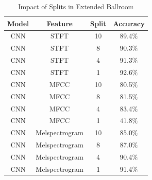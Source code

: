 \documentclass[10pt,twocolumn,letterpaper]{article}
\begin{document}
	\begin{table}[!htbp] %
		\caption{Impact of Splits in Extended Ballroom}
		\centering
		\begin{tabular}[b]{cccc}
			\hline \hline
			Model & Feature & Split & Accuracy 		\\ [0.5ex]
			\hline
			CNN & STFT &  10 & 89.4\%				\\
			CNN & STFT &  8 & 90.3\%				\\
			CNN & STFT &  4 & 91.3\%				\\
			CNN & STFT &  1 & 92.6\%				\\
			CNN & MFCC &  10 & 80.5\%				\\
			CNN & MFCC &  8 & 81.5\%				\\
			CNN & MFCC &  4 & 83.4\%				\\
			CNN & MFCC &  1 & 41.8\%				\\
			CNN & Melspectrogram & 10 & 85.0\% 		\\
			CNN & Melspectrogram & 8 & 87.0\% 		\\
			CNN & Melspectrogram & 4 & 90.4\% 		\\
			CNN & Melspectrogram & 1 & 91.4\% 		\\ [1ex]
		\end{tabular}
	\label{table:splitsExtendedBallroom}
	\end{table}
	
	
	
		
	{\small
		
		
	}
	
\end{document}
